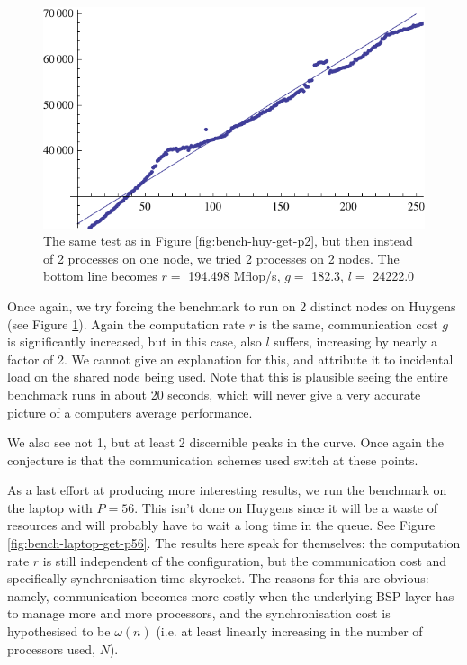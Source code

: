 \documentclass[a4paper]{article}
\begin{document}
\begin{figure}[h]
    \begin{center}
        \includegraphics{img/bench-huy-get-p2-dist.pdf}
    \end{center}
    \caption{The same test as in Figure \ref{fig:bench-huy-get-p2}, but then
    instead of 2 processes on one node, we tried 2 processes on 2 nodes. The
    bottom line becomes $r=$ 194.498 Mflop/s, $g=$ 182.3, $l=$ 24222.0}
    \label{fig:bench-huy-get-p2-dist}
\end{figure}

Once again, we try forcing the benchmark to run on 2 distinct nodes on Huygens
(see Figure \ref{fig:bench-huy-get-p2-dist}). Again the computation rate $r$ is
the same, communication cost $g$ is significantly increased, but in this case,
also $l$ suffers, increasing by nearly a factor of 2. We cannot give an
explanation for this, and attribute it to incidental load on the shared node
being used. Note that this is plausible seeing the entire benchmark runs in
about 20 seconds, which will never give a very accurate picture of a computers
average performance. 

We also see not 1, but at least 2 discernible peaks in the curve. Once again the
conjecture is that the communication schemes used switch at these points. 

As a last effort at producing more interesting results, we run the benchmark on
the laptop with $P=56$. This isn't done on Huygens since it will be a waste of
resources and will probably have to wait a long time in the queue. See Figure
\ref{fig:bench-laptop-get-p56}. The results here speak for themselves: the
computation rate $r$ is still independent of the configuration, but the
communication cost and specifically synchronisation time skyrocket. The reasons
for this are obvious: namely, communication becomes more costly when the
underlying BSP layer has to manage more and more processors, and the
synchronisation cost is hypothesised to be $\omega(n)$ (i.e. at least linearly increasing in
the number of processors used, $N$). 
\end{document}
